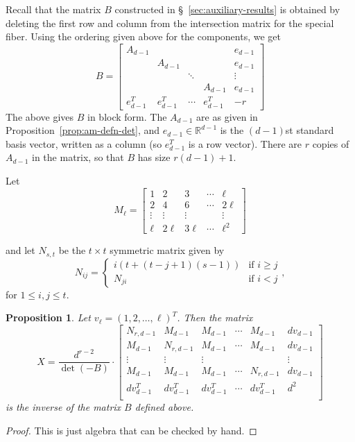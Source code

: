 \documentclass[reqno]{amsart}
\newtheorem{proposition}[thm]{Proposition}
\theoremstyle{definition}
\theoremstyle{remark}
\def\R{\mathbb{R}}
\begin{document}
Recall that the matrix $B$ constructed in \S~\ref{sec:auxiliary-results} is obtained by deleting the first row and column from the intersection matrix for the special fiber. Using the ordering given above for the components, we get
\[
B =
\left[\begin{array}{ccccc}
  A_{d-1} & & & & e_{d-1} \\
  & A_{d-1} & & & e_{d-1} \\
  & & \ddots & & \vdots \\
  & & & A_{d-1} & e_{d-1} \\
  e_{d-1}^T & e_{d-1}^T & \cdots & e_{d-1}^T & -r
\end{array}\right]
\]
The above gives $B$ in block form. The $A_{d-1}$ are as given in Proposition~\ref{prop:am-defn-det}, and $e_{d-1} \in \R^{d-1}$ is the $(d-1)$st standard basis vector, written as a column (so $e_{d-1}^T$ is a row vector). There are $r$ copies of $A_{d-1}$ in the matrix, so that $B$ has size $r(d-1) + 1$.

Let
\[
M_{\ell} =
\left[\begin{array}{ccccc}
  1 & 2 & 3 & \cdots & \ell \\
  2 & 4 & 6 & \cdots & 2\ell \\
  \vdots &\vdots & \vdots & & \vdots \\
  \ell & 2\ell & 3\ell & \cdots & \ell^2 
\end{array}\right]
\]

and let $N_{s,t}$ be the $t \times t$ symmetric matrix given by
\[
N_{ij} = \begin{cases}
    i(t+(t-j+1)(s-1)) & \text{if } i \geq j \\
    N_{ji} & \text{if } i < j
  \end{cases},
\]
for $1 \leq i,j \leq t$.


\begin{proposition}
Let $v_{\ell} = (1,2,\ldots, \ell)^T$. Then the matrix
\[
X = \frac{d^{r-2}}{\det(-B)} \cdot
\left[\begin{array}{cccccc}
  N_{r,d-1} & M_{d-1} & M_{d-1} & \cdots & M_{d-1} & dv_{d-1} \\
  M_{d-1} & N_{r,d-1} & M_{d-1} & \cdots & M_{d-1} & dv_{d-1} \\
  \vdots &\vdots & \vdots & & & \vdots \\
  M_{d-1} & M_{d-1} & M_{d-1} & \cdots &N_{r,d-1} & dv_{d-1}\\
  dv_{d-1}^T & dv_{d-1}^T & dv_{d-1}^T & \cdots & dv_{d-1}^T &d^2 \\
   
\end{array}\right]
\]
is the inverse of the matrix $B$ defined above.
\end{proposition}
\begin{proof}
This is just algebra that can be checked by hand.
\end{proof}
\end{document}
